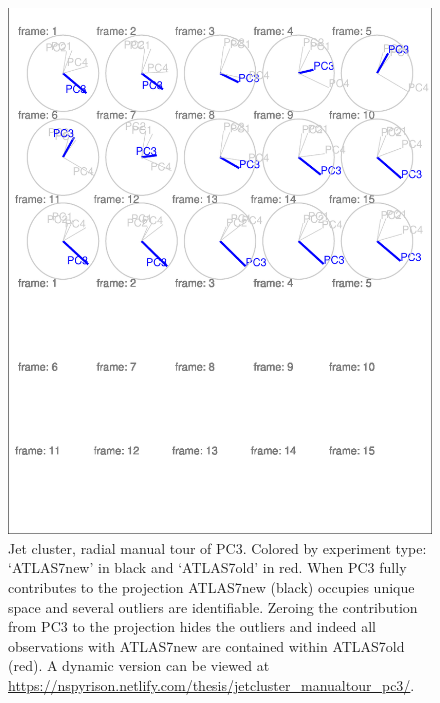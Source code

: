 \documentclass{monashthesis}
\begin{document}
\begin{figure}
\centering
\includegraphics{thesis_files/figure-latex/JetClusterGood-1.pdf}
\caption{\label{fig:JetClusterGood}Jet cluster, radial manual tour of PC3.
Colored by experiment type: `ATLAS7new' in black and `ATLAS7old' in red.
When PC3 fully contributes to the projection ATLAS7new (black) occupies
unique space and several outliers are identifiable. Zeroing the
contribution from PC3 to the projection hides the outliers and indeed
all observations with ATLAS7new are contained within ATLAS7old (red). A
dynamic version can be viewed at
\url{https://nspyrison.netlify.com/thesis/jetcluster_manualtour_pc3/}.}
\end{figure}
\end{document}
